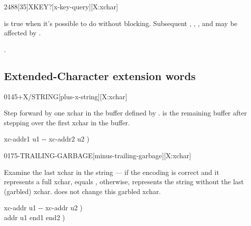\vspace*{-0.5ex}
\begin{worddef}[XKEYq]{2488}[35]{XKEY?}[x-key-query][X:xchar]
\item {}

	 is true when it's possible to do  without
	blocking.  Subsequent , ,
	, and  may be affected
	by .

\see {}.
\end{worddef}


\subsection{Extended-Character extension words} %
\extended

\begin{worddef}{0145}{+X/STRING}[plus-x-string][X:xchar]
\item {}

	Step forward by one xchar in the buffer defined by .
	 is the remaining buffer after stepping over the
	first xchar in the buffer.

	\begin{implement}
	\word{:}   xc-addr1 u1 -{}- xc-addr2 u2 ) \\
	\tab {}    \word{-}  \word{;}
	\end{implement}
\end{worddef}


\begin{worddef}{0175}{-TRAILING-GARBAGE}[minus-trailing-garbage][X:xchar]
\item {}

	Examine the last xchar in the string  --- if the
	encoding is correct and it represents a full xchar,  equals
	, otherwise,  represents the string without the
	last (garbled) xchar.   does not change this
	garbled xchar.

	\begin{implement}
	\word{:}   xc-addr u1 -{}- xc-addr u2 ) \\
	\tab {} \word{+}    addr u1 end1 end2 ) \\
	\tab {}    \word{-}  \word{+} \word{=}    \\
	\tab[2]  \\
	\tab {} \\
	\tab[2]    \word{-} \\
	\tab {} \word{;}
	\end{implement}
\end{worddef}


